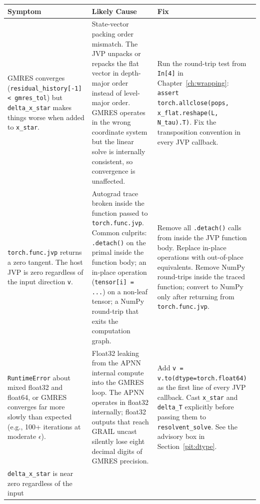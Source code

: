 \noindent
\begin{longtable}{p{} p{} p{}}
\toprule
\textbf{Symptom} & \textbf{Likely Cause} & \textbf{Fix} \\
\midrule
\endhead
\bottomrule
\endfoot

\raggedright\arraybackslash
GMRES converges (\texttt{residual\_history[-1] < gmres\_tol}) but
\texttt{delta\_x\_star} makes things worse when added to
\texttt{x\_star}.
&
\raggedright\arraybackslash
State-vector packing order mismatch.
The JVP unpacks or repacks the flat vector in depth-major order instead of
level-major order.
GMRES operates in the wrong coordinate system but the linear solve is
internally consistent, so convergence is unaffected.
&
\raggedright\arraybackslash
Run the round-trip test from \texttt{In[4]} in
Chapter~\ref{ch:wrapping}:
\texttt{assert torch.allclose(pops, x\_flat.reshape(L, N\_tau).T)}.
Fix the transposition convention in every JVP callback.
\\
\raggedright\arraybackslash
\texttt{torch.func.jvp} returns a zero tangent.
The host JVP is zero regardless of the input direction \texttt{v}.
&
\raggedright\arraybackslash
Autograd trace broken inside the function passed to
\texttt{torch.func.jvp}.
Common culprits: \texttt{.detach()} on the primal inside the function body;
an in-place operation (\texttt{tensor[i] = ...}) on a non-leaf tensor;
a NumPy round-trip that exits the computation graph.
&
\raggedright\arraybackslash
Remove all \texttt{.detach()} calls from inside the JVP function body.
Replace in-place operations with out-of-place equivalents.
Remove NumPy round-trips inside the traced function; convert to NumPy
only after returning from \texttt{torch.func.jvp}.
\\
\raggedright\arraybackslash
\texttt{RuntimeError} about mixed float32 and float64, or GMRES
converges far more slowly than expected (e.g., 100+ iterations at
moderate $\epsilon$).
&
\raggedright\arraybackslash
Float32 leaking from the APNN internal compute into the GMRES loop.
The APNN operates in float32 internally; float32 outputs that reach
GRAIL uncast silently lose eight decimal digits of GMRES precision.
&
\raggedright\arraybackslash
Add \texttt{v = v.to(dtype=torch.float64)} as the first line of every
JVP callback.
Cast \texttt{x\_star} and \texttt{delta\_T} explicitly before
passing them to \texttt{resolvent\_solve}.
See the advisory box in Section~\ref{pit:dtype}.
\\
\raggedright\arraybackslash
\texttt{delta\_x\_star} is near zero regardless of the input

\end{longtable}
